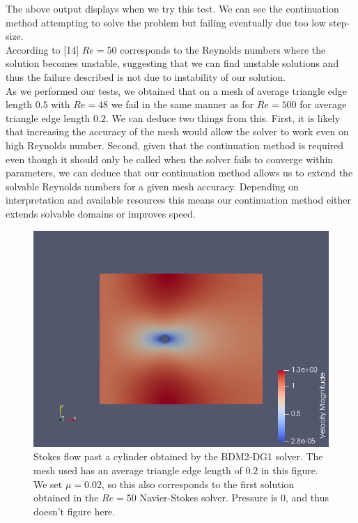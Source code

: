 \documentclass[11pt,twoside,a4paper]{article}
\begin{document}
The above output displays when we try this test. We can see the continuation method attempting to solve the problem but failing eventually due too low step-size.\\
According to [14] $Re = 50$ corresponds to the Reynolds numbers where the solution becomes unstable, suggesting that we can find unstable solutions and thus the failure described is not due to instability of our solution.\\
As we performed our tests, we obtained that on a mesh of average triangle edge length $0.5$ with $Re = 48$ we fail in the same manner as for $Re = 500$ for average triangle edge length $0.2$. We can deduce two things from this. First, it is likely that increasing the accuracy of the mesh would allow the solver to work even on high Reynolds number. Second, given that the continuation method is required even though it should only be called when the solver fails to converge within parameters, we can deduce that our continuation method allows us to extend the solvable Reynolds numbers for a given mesh accuracy. Depending on interpretation and available resources this means our continuation method either extends solvable domains or improves speed.

\begin{figure}
  \includegraphics[width=\linewidth]{scR50.png}
  \caption{Stokes flow past a cylinder obtained by the BDM2-DG1 solver. The mesh used has an average triangle edge length of $0.2$ in this figure. We set $\mu = 0.02$, so this also corresponds to the first solution obtained in the $Re =50$ Navier-Stokes solver. Pressure is $0$, and thus doesn't figure here.}
\end{figure}
\end{document}
